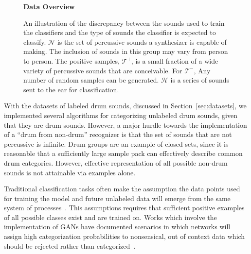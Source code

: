 \documentclass[\main/thesis.tex]{subfiles}
\begin{document}
\begin{figure}[]
    \begin{center}
    \textbf{Data Overview}
    \end{center}
    \caption{ An illustration of the discrepancy between the sounds used to train the classifiers and the type of sounds the classifier is expected to classify. $\mathcal{N}$ is the set of percussive sounds a synthesizer is capable of making. The inclusion of sounds in this group may vary from person to person. The positive samples, $\mathcal{T^{+}}$, is a small fraction of a wide variety of percussive sounds that are conceivable. For $\mathcal{T^{-}}$, Any number of random samples can be generated. $\mathcal{H}$ is a series of sounds sent to the ear for classification.}
\label{fig:ven_data}
\end{figure}
 With the datasets of labeled drum sounds, discussed in Section~\ref{sec:datasets}, we implemented several algorithms for categorizing unlabeled drum sounds, given that they are drum sounds. However, a major hurdle towards the implementation of a \enquote{drum from non-drum} recognizer is that the set of sounds that are not percussive is infinite. Drum groups are an example of closed sets, since it is reasonable that a sufficiently large sample pack can effectively describe common drum categories. However, effective representation of all possible non-drum sounds is not attainable via examples alone.

Traditional classification tasks often make the assumption the data points used for training the model and future unlabeled data will emerge from the same system of processes~\cite{geng2020recent,mundt2019open}. This assumptions requires that sufficient positive examples of all possible classes exist and are trained on. Works which involve the implementation of GANs have documented scenarios in which networks will assign high categorization probabilities to nonsensical, out of context data which should be rejected rather than categorized~\cite{geng2020recent,mundt2019open,hassen2020learning}. \\
\end{document}
